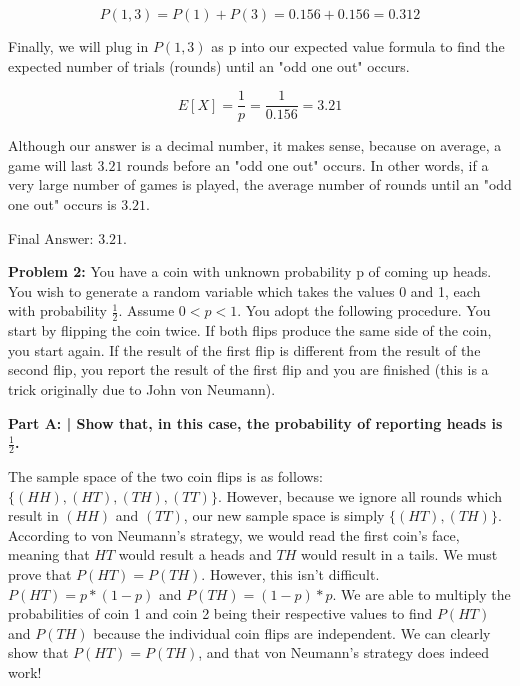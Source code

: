 \documentclass{article}
\begin{document}
 \[P(1, 3)=P(1)+P(3) = 0.156 + 0.156 = 0.312\]
 
 Finally, we will plug in $P(1, 3)$ as p into our expected value formula to find the expected number of trials (rounds) until an "odd one out" occurs.
 
 \[E[X]=\frac{1}{p}=\frac{1}{0.156} = 3.21\]
 
 Although our answer is a decimal number, it makes sense, because on average, a game will last $3.21$ rounds before an "odd one out" occurs. In other words, if a very large number of games is played, the average number of rounds until an "odd one out" occurs is $3.21$.
 
 Final Answer: $3.21$.\newline
 
 \newpage
 
 \noindent\makebox[\linewidth]{\rule{\paperwidth}{0.4pt}}\newline
 
 \begin{center}
      \Large\textbf{Problem 2:} You have a coin with unknown probability p of coming up heads. You wish to generate a random variable which takes the values 0 and 1, each with probability $\frac{1}{2}$. Assume $0 < p < 1$. You adopt the following procedure. You start by flipping the coin twice. If both flips produce the same side of the coin, you start again. If the result of the first flip is different from the result of the second flip, you report the result of the first flip and you are finished (this is a trick originally due to John von Neumann).\par
 \end{center}
 
 \textbf{Part A: | Show that, in this case, the probability of reporting heads is $\frac{1}{2}$.}\newline
 
 The sample space of the two coin flips is as follows: $\{(HH), (HT), (TH), (TT)\}$. However, because we ignore all rounds which result in $(HH)$ and $(TT)$, our new sample space is simply $\{(HT), (TH)\}$. According to von Neumann's strategy, we would read the first coin's face, meaning that $HT$ would result a heads and $TH$ would result in a tails. We must prove that $P(HT) = P(TH)$. However, this isn't difficult. $P(HT) = p * (1-p)$ and $P(TH) = (1-p) * p$. We are able to multiply the probabilities of coin 1 and coin 2 being their respective values to find $P(HT)$ and $P(TH)$ because the individual coin flips are independent. We can clearly show that $P(HT) = P(TH)$, and that von Neumann's strategy does indeed work!
 
\end{document}
